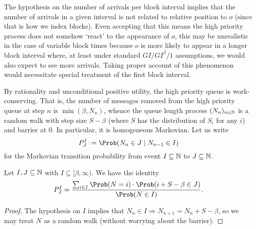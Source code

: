 \documentclass[a4paper,11pt]{article}
\begin{document}
\begin{remark}

  The hypothesis on the number of arrivals per block interval implies that the number of arrivals in a given interval is not related to relative position to $o$ (since that is how we index blocks).
  Even accepting that this means the high priority process does not somehow `react' to the appearance of $o$, this may be unrealistic in the case of variable block times because $o$ is more likely to appear in a longer block interval where, at least under standard $GI/GI^\beta/1$ assumptions, we would also expect to see more arrivals.
  Taking proper account of this phenomenon would necessitate special treatment of the first block interval.
  
\end{remark}

By rationality and unconditional positive utility, the high priority queue is work-conserving.
%
That is, the number of messages removed from the high priority queue at step $n$ is $\min(\beta,N_{n})$, whence the queue length process $(N_{n})_{n\in\mathbb N}$ is a random walk with step size $S-\beta$ (where $S$ has the distribution of $S_i$ for any $i$) and barrier at $0$.
%
In particular, it is homogeneous Markovian.
%
Let us write
\begin{equation}
  P^I_J \defeq \Prob(N_{n} \in J \mid N_{n-1}\in I) 
\end{equation}
for the Markovian transition probability from event $I\subseteq\mathbb N$ to $J\subseteq\mathbb N$.

\begin{lemma}
\label{markov-transition-ratio}

  Let $I,J\subseteq\mathbb N$ with $I\subseteq[\beta,\infty)$. We have the identity
  \[
    P^I_J = \frac{\sum_{i\in I}\Prob(N=i)\cdot \Prob(i+S-\beta\in J)}
    { \Prob(N\in I) }.
  \]
  
\end{lemma}
%
\begin{proof}

  The hypothesis on $I$ implies that $N_n\in I\Rightarrow N_{n+1}=N_n+S-\beta$, so we may treat $N$ as a random walk (without worrying about the barrier).\qedhere

\end{proof}
\end{document}
